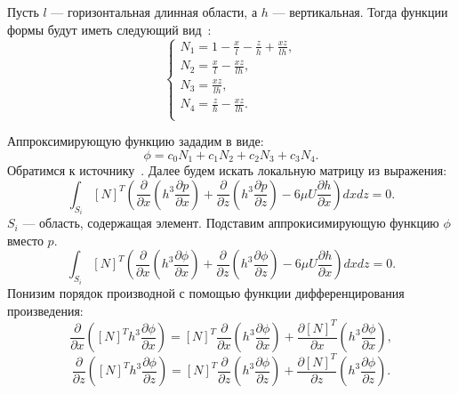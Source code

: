 \documentclass[a4paper,14pt]{extarticle}
\begin{document}
Пусть $l$ --- горизонтальная длинная области, а $h$ --- вертикальная. Тогда функции формы будут иметь следующий вид~\cite{seshu}:
\begin{equation}
	\begin{cases}
		N_1 = 1 - \frac{x}{l} - \frac{z}{h} + \frac{x  z}{l  h}, \\
		N_2 = \frac{x}{l} - \frac{x  z}{l  h}, \\
		N_3 = \frac{x  z}{l h}, \\
		N_4 = \frac{z}{h} - \frac{x  z}{l  h}. \\
	\end{cases}
\label{form-func}
\end{equation}

\noindent
Аппроксимирующую функцию зададим в виде:
\begin{equation*}
	\phi = c_0 N_1 + c_1 N_2 + c_2 N_3 + c_3 N_4.
\end{equation*}
\noindent 
Обратимся к источнику~\cite{slezkin_smazka}. Далее будем искать локальную матрицу из выражения:
\begin{equation}
	\label{init_eq}
	\int_{S_i} {[N]^T \left(\frac{\partial}{\partial x} \left(h^3 \frac{\partial p}{\partial x} \right) + \frac{\partial}{\partial z} \left(h^3 \frac{\partial p}{\partial z} \right) - 6 \mu U \frac{\partial h}{\partial x}\right) dx dz} = 0.
\end{equation}
$S_i$ --- область, содержащая элемент. 
Подставим аппрокисимирующую функцию $\phi$ вместо $p$.
\begin{equation*}
	\int_{S_i} {[N]^T \left(\frac{\partial}{\partial x} \left(h^3 \frac{\partial \phi}{\partial x} \right) + \frac{\partial}{\partial z} \left(h^3 \frac{\partial \phi}{\partial z} \right) - 6 \mu U \frac{\partial h}{\partial x}\right) dx dz} = 0.
\end{equation*}
Понизим порядок производной с помощью функции дифференцирования произведения:
\begin{equation*}
	 \frac{\partial}{\partial x} \left( [N]^T h^3 \frac{\partial \phi}{\partial x} \right)  = [N]^T \frac{\partial}{\partial x} \left(h^3 \frac{\partial \phi}{\partial x} \right) + \frac{\partial[N]^T}{\partial x} \left(h^3 \frac{\partial \phi}{\partial x} \right),
\end{equation*}
\begin{equation*}
	 \frac{\partial}{\partial z} \left( [N]^T h^3 \frac{\partial \phi}{\partial z} \right)  = [N]^T \frac{\partial}{\partial z} \left(h^3 \frac{\partial \phi}{\partial z} \right) + \frac{\partial[N]^T}{\partial z} \left(h^3 \frac{\partial \phi}{\partial z} \right).
\end{equation*}
\end{document}
